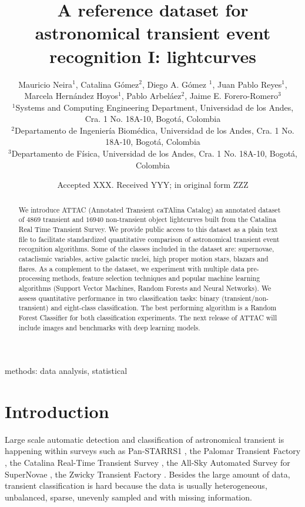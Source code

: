 \documentclass[usenatbib]{mnras}
\title[A reference transient dataset I: lightcurves]{A reference
  dataset for astronomical transient event recognition I: lightcurves}
\author[M. Neira et al.]
{Mauricio Neira$^{1}$, Catalina G\'omez$^{2}$, Diego A. G\'omez $^{1}$,
Juan Pablo Reyes$^{1}$,
\newauthor
Marcela Hern\'andez Hoyos$^{1}$,   
Pablo Arbel\'aez$^{2}$,
Jaime E. Forero-Romero$^{3}$
\\
$^{1}$Systems and Computing Engineering Department, Universidad de los Andes, Cra. 1 No. 18A-10, Bogot\'a, Colombia\\
$^{2}$Departamento de Ingenier\'ia Biom\'edica, Universidad de los Andes, Cra. 1 No. 18A-10, Bogot\'a, Colombia\\
$^{3}$Departamento de F\'isica, Universidad de los Andes, Cra. 1 No. 18A-10, Bogot\'a, Colombia
}
\date{Accepted XXX. Received YYY; in original form ZZZ}
\begin{document}
\label{firstpage}
\pagerange{\pageref{firstpage}--\pageref{lastpage}}
\maketitle

\begin{abstract}
We introduce ATTAC (Annotated Transient caTAlina Catalog) an
annotated dataset of $4869$ transient and $16940$ non-transient
object lightcurves built from the Catalina Real Time Transient
Survey.
We provide public access to this dataset as a plain text file to facilitate
standardized quantitative comparison of astronomical transient event
recognition algorithms. 
Some of the classes included in the dataset are: supernovae, cataclismic
variables, active galactic nuclei, high proper motion stars, blazars
and flares.
As a complement to the dataset, we experiment with multiple
data pre-processing methods, feature selection techniques and popular
machine learning algorithms (Support Vector Machines, Random Forests
and Neural Networks).   
We assess quantitative performance in two classification tasks:
binary (transient/non-transient) and eight-class classification.   
The best performing algorithm is a Random Forest Classifier for both
classification experiments.  
The next release of ATTAC will include images and benchmarks with
deep learning models. 
\end{abstract}

\begin{keywords}
methods: data analysis, statistical
\end{keywords}



\section{Introduction}



Large scale automatic detection and classification of astronomical
transient is happening within surveys such as Pan-STARRS1
\citep{2004SPIE.5489...11K}, the Palomar Transient Factory
\citep{2009PASP..121.1395L},  the Catalina Real-Time Transient Survey
\citep{2009ApJ...696..870D}, the All-Sky Automated Survey for
SuperNovae \citep{2014ApJ...788...48S}, the Zwicky Transient
Factory \citep{2019PASP..131a8002B}.
Besides the large amount of data, transient
classification is hard because the data is usually heterogeneous,
unbalanced, sparse, unevenly sampled and with missing information.   
\end{document}
